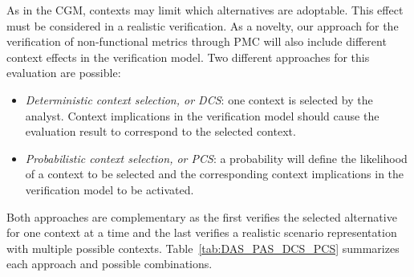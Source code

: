 As in the CGM, contexts may limit which alternatives are adoptable. This effect must be considered in a realistic verification. As a novelty, our approach for the verification of non-functional metrics through PMC will also include different context effects in the verification model. Two different approaches for this evaluation are possible: 

\begin{itemize}

\item \textit{Deterministic context selection, or DCS}: one context is selected by the analyst. Context implications in the verification model should cause the evaluation result to correspond to the selected context.
\bigskip

\item \textit{Probabilistic context selection, or PCS}: a probability will define the likelihood of a context to be selected and the corresponding context implications in the verification model to be activated.  

\end{itemize}

Both approaches are complementary as the first verifies the selected alternative for one context at a time and the last verifies a realistic scenario representation with multiple possible contexts. Table~\ref{tab:DAS_PAS_DCS_PCS} summarizes each approach and possible combinations.

